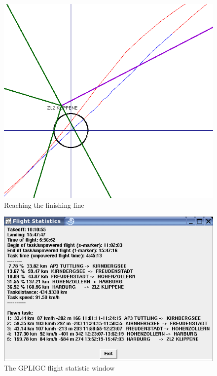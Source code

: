 \begin{figure}[h]
\caption{\label{finish}Reaching the finishing line}
\begin{center}
\includegraphics[width=\textwidth]{png/finish}
\end{center}
\end{figure}

\begin{figure}[h]
\caption{\label{flightstatistic}The GPLIGC flight statistic window}
\begin{center}
\includegraphics[width=\textwidth]{png/flightstatistic}
\end{center}
\end{figure}

